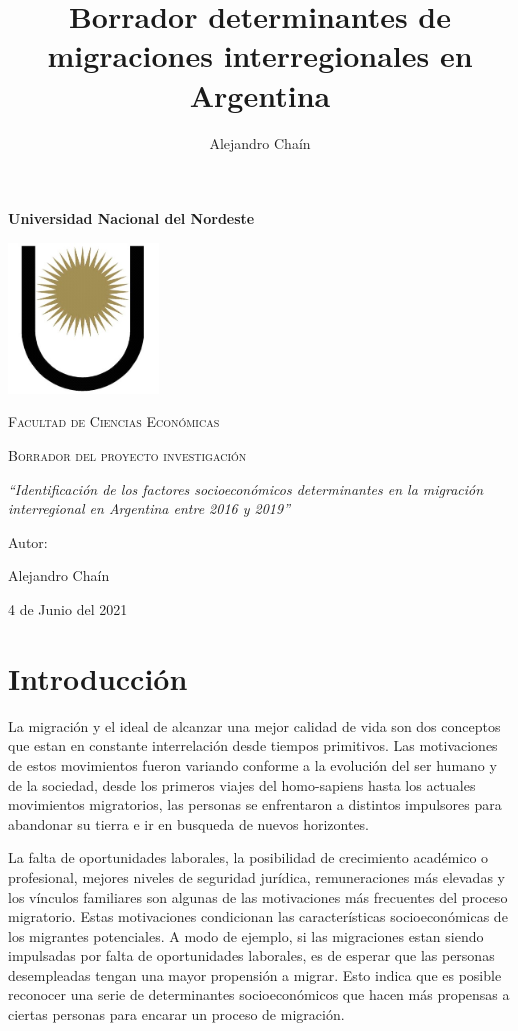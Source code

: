 \documentclass[12pt,a4paper]{article}
\author{Alejandro Chaín}
\title{Borrador determinantes de migraciones interregionales en Argentina}
\begin{document}
\begin{titlepage}
\centering
\vspace{3cm}
{\bfseries\LARGE Universidad Nacional del Nordeste\par}
\vspace{1cm}
{\includegraphics[width=0.3\textwidth]{logounne.png}\par}
{\scshape\Large Facultad de Ciencias Econ\'omicas\par}
\vspace{2cm}
{\scshape\Huge Borrador del proyecto investigación \par}
\vspace{2cm}
{\itshape\Large ``Identificación de los factores socioeconómicos determinantes en la migración
interregional en Argentina entre 2016 y 2019'' \par}
\vfill
{\Large Autor: \par}
{\Large Alejandro Chaín\par}
\vfill
{\Large 4 de Junio del 2021 \par}
\end{titlepage}

\newpage
\tableofcontents
\newpage
\section{Introducción}

La migración y el ideal de alcanzar una mejor calidad de vida son dos conceptos que estan en constante interrelación desde tiempos primitivos. Las motivaciones de estos movimientos fueron variando conforme a la evolución del ser humano y de la sociedad, desde los primeros viajes del homo-sapiens hasta los actuales movimientos migratorios, las personas se enfrentaron a distintos impulsores para abandonar su tierra e ir en busqueda de nuevos horizontes. 

La falta de oportunidades laborales, la posibilidad de crecimiento académico o profesional, mejores niveles de seguridad jurídica, remuneraciones más elevadas y los vínculos familiares son algunas de las motivaciones más frecuentes del proceso migratorio. Estas motivaciones condicionan las características socioeconómicas de los migrantes potenciales. A modo de ejemplo, si las migraciones estan siendo impulsadas por falta de oportunidades laborales, es de esperar que las personas desempleadas tengan una mayor propensión a migrar. Esto indica que es posible reconocer una serie de determinantes socioeconómicos que hacen más propensas a ciertas personas para encarar un proceso de migración. 
\end{document}
